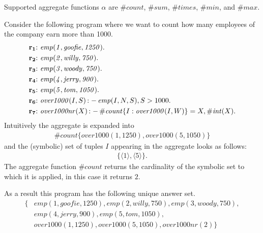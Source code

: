 \documentclass[a4paper, titlepage]{article}
\newcommand{\mi}[1]{\mathit{#1}}
\DeclareMathOperator{\leftimpl}{:-}
\newcommand{\rowprefix}[1]{%
  \ensuremath{\color{black}\mathbf{#1{:}}\ }%
}
\begin{document}
Supported aggregate functions $\alpha$ are
$\mathit{\#count}$, $\mathit{\#sum}$, $\mathit{\#times}$, 
$\mathit{\#min}$, and $\mathit{\#max}$.

\begin{exmp}
Consider the following program
where we want to count how many employees of the company
earn more than 1000. 
\begin{align*}
\rowprefix{r_1}& \mi{emp(1,goofie,1250)}.\\
\rowprefix{r_2}& \mi{emp(2,willy,750)}.\\
\rowprefix{r_3}& \mi{emp(3,woody,750)}.\\
\rowprefix{r_4}& \mi{emp(4,jerry,900)}.\\
\rowprefix{r_5}& \mi{emp(5,tom,1050)}. \\
\rowprefix{r_6}& \mi{over1000}(I,S) \leftimpl \mi{emp}(I,N,S), S > 1000.\\
\rowprefix{r_7}& \mi{over1000nr}(X) \leftimpl
  \mi{\#count}\{I : \mi{over1000}(I,W)\} = X, \mi{\#int}(X).
\end{align*}
Intuitively the aggregate is expanded into
\begin{align*}
\#count\{over1000(1,1250),over1000(5,1050)\}
\end{align*}
and the (symbolic) set of tuples $I$
appearing in the aggregate looks as follows:
\begin{align*}
\{\langle 1 \rangle,\langle 5 \rangle\}.
\end{align*}
The aggregate function $\mathit{\#count}$ returns the 
cardinality of the symbolic set to which it is applied,
in this case it returns $2$.

As a result this program has the following unique answer set.
\begin{align*}
\{ & \mathit{emp(1,goofie,1250),emp(2,willy,750),emp(3,woody,750),}\\
   & \mathit{emp(4,jerry,900),emp(5,tom,1050),}\\
   & \mathit{over1000(1,1250),over1000(5,1050),over1000nr(2)} \}
\end{align*}
\end{exmp}
\end{document}
